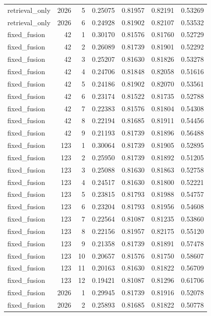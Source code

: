 \begin{tabular}{lrrrrrr}
retrieval_only & 2026 & 5 & 0.25075 & 0.81957 & 0.82191 & 0.53269 \\
retrieval_only & 2026 & 6 & 0.24928 & 0.81902 & 0.82107 & 0.53532 \\
fixed_fusion & 42 & 1 & 0.30170 & 0.81576 & 0.81760 & 0.52729 \\
fixed_fusion & 42 & 2 & 0.26089 & 0.81739 & 0.81901 & 0.52292 \\
fixed_fusion & 42 & 3 & 0.25207 & 0.81630 & 0.81826 & 0.53278 \\
fixed_fusion & 42 & 4 & 0.24706 & 0.81848 & 0.82058 & 0.51616 \\
fixed_fusion & 42 & 5 & 0.24186 & 0.81902 & 0.82070 & 0.53561 \\
fixed_fusion & 42 & 6 & 0.23174 & 0.81522 & 0.81735 & 0.52788 \\
fixed_fusion & 42 & 7 & 0.22383 & 0.81576 & 0.81804 & 0.54308 \\
fixed_fusion & 42 & 8 & 0.22194 & 0.81685 & 0.81911 & 0.54456 \\
fixed_fusion & 42 & 9 & 0.21193 & 0.81739 & 0.81896 & 0.56488 \\
fixed_fusion & 123 & 1 & 0.30064 & 0.81739 & 0.81905 & 0.52895 \\
fixed_fusion & 123 & 2 & 0.25950 & 0.81739 & 0.81892 & 0.51205 \\
fixed_fusion & 123 & 3 & 0.25088 & 0.81630 & 0.81863 & 0.52758 \\
fixed_fusion & 123 & 4 & 0.24517 & 0.81630 & 0.81800 & 0.52221 \\
fixed_fusion & 123 & 5 & 0.23815 & 0.81793 & 0.81988 & 0.54757 \\
fixed_fusion & 123 & 6 & 0.23204 & 0.81793 & 0.81956 & 0.54608 \\
fixed_fusion & 123 & 7 & 0.22564 & 0.81087 & 0.81235 & 0.53860 \\
fixed_fusion & 123 & 8 & 0.22156 & 0.81957 & 0.82175 & 0.55120 \\
fixed_fusion & 123 & 9 & 0.21358 & 0.81739 & 0.81891 & 0.57478 \\
fixed_fusion & 123 & 10 & 0.20657 & 0.81576 & 0.81750 & 0.58607 \\
fixed_fusion & 123 & 11 & 0.20163 & 0.81630 & 0.81822 & 0.56709 \\
fixed_fusion & 123 & 12 & 0.19421 & 0.81087 & 0.81296 & 0.61706 \\
fixed_fusion & 2026 & 1 & 0.29945 & 0.81739 & 0.81916 & 0.52078 \\
fixed_fusion & 2026 & 2 & 0.25893 & 0.81685 & 0.81822 & 0.50778 \\

\end{tabular}
